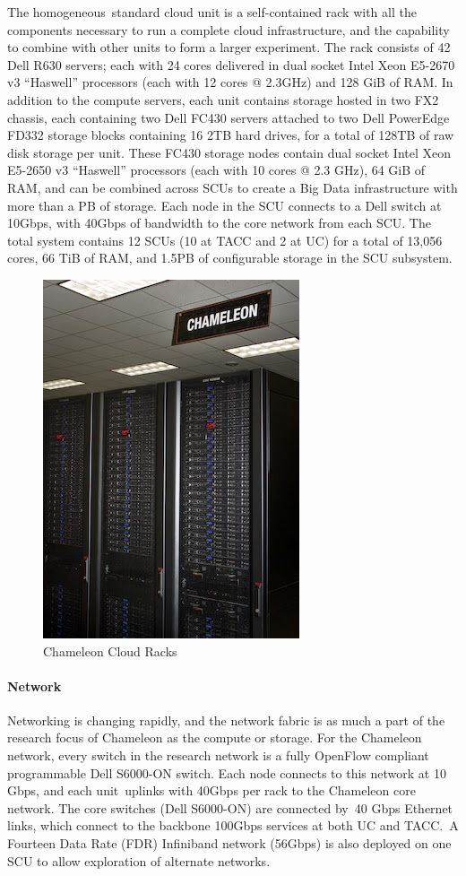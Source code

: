 The homogeneous~standard cloud unit is a self-contained rack with all
the components necessary to run a complete cloud infrastructure, and the
capability to combine with other units to form a larger experiment. The
rack consists of 42 Dell R630 servers; each with 24 cores delivered in
dual socket Intel Xeon E5-2670 v3 ``Haswell'' processors (each with 12
cores @ 2.3GHz) and 128 GiB of RAM. In addition to the compute servers,
each unit contains storage hosted in two FX2 chassis, each containing
two Dell FC430 servers attached to two Dell PowerEdge FD332 storage
blocks containing 16 2TB hard drives, for a total of 128TB of raw disk
storage per unit. These FC430 storage nodes contain dual socket Intel
Xeon E5-2650 v3 ``Haswell'' processors (each with 10 cores @ 2.3 GHz),
64 GiB of RAM, and can be combined across SCUs to create a Big Data
infrastructure with more than a PB of storage. Each node in the SCU
connects to a Dell switch at 10Gbps, with 40Gbps of bandwidth to the
core network from each SCU. The total system contains 12 SCUs (10 at
TACC and 2 at UC) for a total of 13,056 cores, 66 TiB of RAM, and 1.5PB
of configurable storage in the SCU subsystem.

\begin{figure}[htb]
\centering \includegraphics[width=0.5\columnwidth]{images/chameleon/Chameleon2.jpeg}
\caption{Chameleon Cloud Racks}
\end{figure}

\paragraph{Network}\label{network}

Networking is changing rapidly, and the network fabric is as much a part
of the research focus of Chameleon as the compute or storage. For the
Chameleon network, every switch in the research network is a fully
OpenFlow compliant programmable Dell S6000-ON switch. Each node connects
to this network at 10 Gbps, and each unit~uplinks with 40Gbps per rack
to the Chameleon core network. The core switches (Dell S6000-ON) are
connected by~40 Gbps Ethernet links, which connect to the backbone
100Gbps services at both UC and TACC.~A Fourteen Data Rate (FDR)
Infiniband network (56Gbps) is also deployed on one SCU to allow
exploration of alternate networks.


